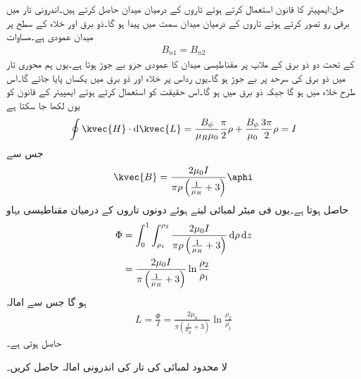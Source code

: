 حل:ایمپیئر کا قانون استعمال کرتے ہوئے تاروں کے درمیان میدان حاصل کرتے ہیں۔اندرونی تار میں برقی رو  تصور کرتے ہوئے تاروں کے درمیان میدان  سمت میں پیدا ہو گا۔ذو برق اور خلاء کے سطح پر میدان عمودی ہے۔مساوات 
\begin{align*}
B_{n1}=B_{n2}
\end{align*}
 کے تحت دو ذو برق کے ملاپ پر مقناطیسی میدان کا عمودی جزو بے جوڑ ہوتا ہے۔یوں ہم محوری تار میں ذو برق کی سرحد پر  بے جوڑ ہو گا۔یوں رداس  پر خلاء اور ذو برق میں یکساں  پایا جائے گا۔اس طرح خلاء میں  ہو گا جبکہ ذو برق میں  ہو گا۔اس حقیقت کو استعمال کرتے ہوئے ایمپیئر کے قانون کو یوں لکھا جا سکتا ہے
\begin{align*}
\oint \kvec{H} \cdot \dif \kvec{L}=\frac{B_{\phi}}{\mu_R \mu_0} \frac{\pi}{2} \rho+\frac{B_{\phi}}{\mu_0} \frac{3\pi}{2} \rho=I
\end{align*} 
جس سے 
\begin{align*}
\kvec{B}=\frac{2\mu_0 I}{\pi \rho \left(\frac{1}{\mu_R}+3\right)} \aphi
\end{align*}
حاصل ہوتا ہے۔یوں فی میٹر لمبائی لیتے ہوئے دونوں تاروں کے درمیان مقناطیسی بہاو
\begin{align*}
\Phi&=\int_0^{1} \int_{\rho_1}^{\rho_2} \frac{2\mu_0 I}{\pi \rho \left(\frac{1}{\mu_R}+3\right)} \dif \rho \dif z\\
&=\frac{2\mu_0 I}{\pi  \left(\frac{1}{\mu_R}+3\right)} \ln \frac{\rho_2}{\rho_1}
\end{align*}
ہو گا جس سے امالہ
\begin{align*}
L=\frac{\Phi}{I}=\frac{2\mu_0}{\pi  \left(\frac{1}{\mu_R}+3\right)} \ln \frac{\rho_2}{\rho_1}
\end{align*}
حاصل ہوتی ہے۔

\quad لا محدود لمبائی کی تار کی اندرونی امالہ حاصل کریں۔

